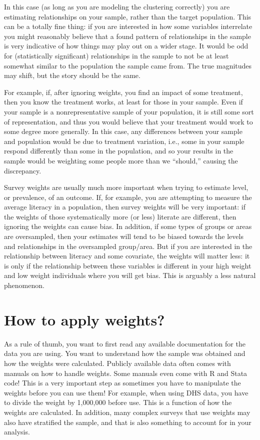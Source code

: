 \documentclass[
  letterpaper,
  DIV=11,
  numbers=noendperiod]{scrreprt}
\begin{document}
In this case (as long as you are modeling the clustering correctly) you
are estimating relationships on your sample, rather than the target
population. This can be a totally fine thing: if you are interested in
how some variables interrelate you might reasonably believe that a found
pattern of relationships in the sample is very indicative of how things
may play out on a wider stage. It would be odd for (statistically
significant) relationships in the sample to not be at least somewhat
similar to the population the sample came from. The true magnitudes may
shift, but the story should be the same.

For example, if, after ignoring weights, you find an impact of some
treatment, then you know the treatment works, at least for those in your
sample. Even if your sample is a nonrepresentative sample of your
population, it is still some sort of representation, and thus you would
believe that your treatment would work to some degree more generally. In
this case, any differences between your sample and population would be
due to treatment variation, i.e., some in your sample respond
differently than some in the population, and so your results in the
sample would be weighting some people more than we ``should,'' causing
the discrepancy.

Survey weights are usually much more important when trying to estimate
level, or prevalence, of an outcome. If, for example, you are attempting
to measure the average literacy in a population, then survey weights
will be very important: if the weights of those systematically more (or
less) literate are different, then ignoring the weights can cause bias.
In addition, if some types of groups or areas are oversampled, then your
estimates will tend to be biased towards the levels and relationships in
the oversampled group/area. But if you are interested in the
relationship between literacy and some covariate, the weights will
matter less: it is only if the relationship between these variables is
different in your high weight and low weight individuals where you will
get bias. This is arguably a less natural phenomenon.

\section{How to apply weights?}\label{how-to-apply-weights}

As a rule of thumb, you want to first read any available documentation
for the data you are using. You want to understand how the sample was
obtained and how the weights were calculated. Publicly available data
often comes with manuals on how to handle weights. Some manuals even
come with R and Stata code! This is a very important step as sometimes
you have to manipulate the weights before you can use them! For example,
when using DHS data, you have to divide the weight by 1,000,000 before
use. This is a function of how the weights are calculated. In addition,
many complex surveys that use weights may also have stratified the
sample, and that is also something to account for in your analysis.
\end{document}
